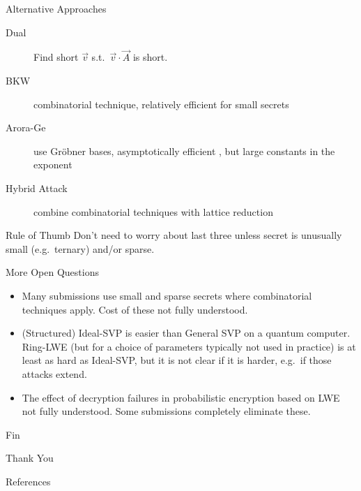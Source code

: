 \documentclass[xcolor=table,10pt,aspectratio=169]{beamer}
\begin{document}
\begin{frame}[label={sec:org431609e}]{Alternative Approaches}
\begin{description}
\item[{Dual}] Find short \(\vec{v}\) s.t. \(\vec{v}\cdot \vec{A}\) is short.
\item[{BKW}] combinatorial technique, relatively efficient for small secrets
\item[{Arora-Ge}] use Gröbner bases, asymptotically efficient , but large constants in the exponent
\item[{Hybrid Attack}] combine combinatorial techniques with lattice reduction
\end{description}

\begin{alertblock}{Rule of Thumb}
Don’t need to worry about last three unless secret is unusually small (e.g. ternary) and/or sparse.
\end{alertblock}
\end{frame}

\begin{frame}[label={sec:orga46f5af}]{More Open Questions}
\begin{itemize}
\item Many submissions use small and sparse secrets where combinatorial techniques apply. Cost of these not fully understood.
\item (Structured) Ideal-SVP is easier than General SVP on a quantum computer. Ring-LWE (but for a choice of parameters typically not used in practice) is at least as hard as Ideal-SVP, but it is not clear if it is harder, e.g. if those attacks extend.
\item The effect of decryption failures in probabilistic encryption based on LWE not fully understood. Some submissions completely eliminate these.
\end{itemize}
\end{frame}

\begin{frame}[label={sec:org1ac4aa4},standout]{Fin}
\begin{center}
\Huge \alert{Thank You}
\end{center}
\end{frame}

\begin{frame}[allowframebreaks]{References}
\renewcommand*{\bibfont}{\scriptsize}
\printbibliography[heading=none]
\end{frame}
\end{document}
